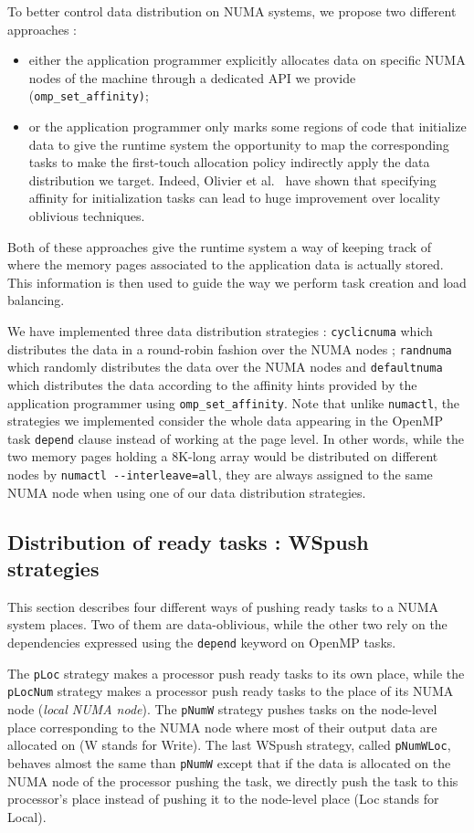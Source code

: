 \documentclass{Styles/llncs}
\begin{document}
To better control data distribution on NUMA systems, we propose two different approaches :
\begin{itemize}
\item either the application programmer explicitly allocates data on specific NUMA nodes of the machine through a dedicated API we provide (\verb!omp_set_affinity)!;
\item or the application programmer only marks some regions of code that initialize data to give the runtime system the opportunity to map the corresponding tasks to make the first-touch allocation policy indirectly apply the data distribution we target. Indeed, Olivier et al.~\cite{Olivier:2012:CMW:2388996.2389085}
have shown that specifying affinity for initialization tasks can lead to huge improvement over locality oblivious techniques.
\end{itemize}
Both of these approaches give the runtime system a way of keeping track of where the memory pages associated to the application data is actually stored.
This information is then used to guide the way we perform task creation and load balancing.

We have implemented three data distribution strategies : \verb!cyclicnuma! which distributes the data in a round-robin fashion over the NUMA nodes ; \verb!randnuma! which randomly distributes the data over the NUMA nodes and \verb!defaultnuma! which distributes the data according to the affinity hints provided by the application programmer using \verb!omp_set_affinity!.
Note that unlike \verb!numactl!, the strategies we implemented consider the whole data appearing in the OpenMP task \verb!depend! clause instead of working at the page level. In other words, while the two memory pages holding a 8K-long array would be distributed on different nodes by \verb!numactl --interleave=all!, they are always assigned to the same NUMA node when using one of our data distribution strategies.

\subsection{Distribution of ready tasks : WSpush strategies}

This section describes four different ways of pushing ready tasks to a NUMA system places.
Two of them are data-oblivious, while the other two rely on the dependencies expressed using the \verb!depend! keyword on OpenMP tasks.

The \verb/pLoc/ strategy makes a processor push ready tasks to
    its own place, while the \verb/pLocNum/ strategy makes a processor push ready tasks to the place of its NUMA node (\emph{local NUMA node}).
The \verb/pNumW/ strategy pushes tasks on the node-level place corresponding to the NUMA node where most of their output data are allocated on (W stands for Write).
The last WSpush strategy, called \verb/pNumWLoc/, behaves almost the same than \verb!pNumW! except that if
    the data is allocated on the NUMA node of the processor pushing the task, we directly push the task to this processor's place instead of pushing it to the node-level place (Loc stands for Local).
    
\end{document}
